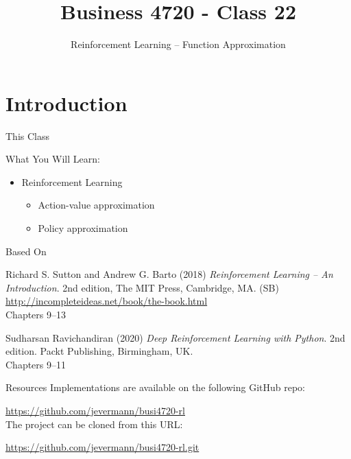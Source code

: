 \documentclass[ignorenonframetext,xcolor=x11names]{beamer}
\title{Business 4720 - Class 22}
\subtitle{Reinforcement Learning -- Function Approximation}
\begin{document}
\begin{frame}[label=full]{}
  \titlepage
  \footnotesize
  
\end{frame}

\section{Introduction}

\begin{frame}[label=full]{This Class}

\begin{block}{What You Will Learn:}
\begin{itemize}
  \item Reinforcement Learning
  \begin{itemize}
     \item Action-value approximation
     \item Policy approximation
  \end{itemize}
\end{itemize}
\end{block}
\end{frame}

\begin{frame}[label=full]{Based On}
\begin{block}{}
Richard S. Sutton and Andrew G. Barto (2018) \emph{Reinforcement Learning -- An Introduction}. 2nd edition, The MIT Press, Cambridge, MA. (SB) \\
\vspace{0.5\baselineskip}
\url{http://incompleteideas.net/book/the-book.html} \\
\vspace{0.5\baselineskip}
Chapters 9--13
\end{block}

\begin{block}{}
Sudharsan Ravichandiran (2020) \emph{Deep Reinforcement Learning with Python}. 2nd edition. Packt Publishing, Birmingham, UK. \\
\vspace{0.5\baselineskip}
Chapters 9--11
\end{block}

\end{frame}

\begin{frame}[label=full]{Resources}
Implementations are available on the following GitHub repo:

\url{https://github.com/jevermann/busi4720-rl} \\


The project can be cloned from this URL:

\url{https://github.com/jevermann/busi4720-rl.git}
\end{frame}
\end{document}
